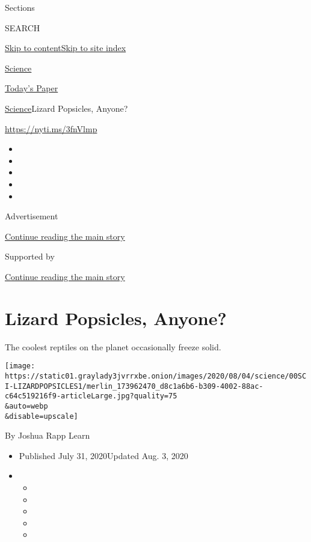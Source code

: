 Sections

SEARCH

\protect\hyperlink{site-content}{Skip to
content}\protect\hyperlink{site-index}{Skip to site index}

\href{https://www.nytimes3xbfgragh.onion/section/science}{Science}

\href{https://myaccount.nytimes3xbfgragh.onion/auth/login?response_type=cookie\&client_id=vi}{}

\href{https://www.nytimes3xbfgragh.onion/section/todayspaper}{Today's
Paper}

\href{/section/science}{Science}\textbar{}Lizard Popsicles, Anyone?

\url{https://nyti.ms/3fnVlmp}

\begin{itemize}
\item
\item
\item
\item
\item
\end{itemize}

Advertisement

\protect\hyperlink{after-top}{Continue reading the main story}

Supported by

\protect\hyperlink{after-sponsor}{Continue reading the main story}

\hypertarget{lizard-popsicles-anyone}{%
\section{Lizard Popsicles, Anyone?}\label{lizard-popsicles-anyone}}

The coolest reptiles on the planet occasionally freeze solid.

\texttt{[image: https://static01.graylady3jvrrxbe.onion/images/2020/08/04/science/00SCI-LIZARDPOPSICLES1/merlin\_173962470\_d8c1a6b6-b309-4002-88ac-c64c519216f9-articleLarge.jpg?quality=75\\\&auto=webp\\\&disable=upscale]}

By Joshua Rapp Learn

\begin{itemize}
\item
  Published July 31, 2020Updated Aug. 3, 2020
\item
  \begin{itemize}
  \item
  \item
  \item
  \item
  \item
  \end{itemize}
\end{itemize}

